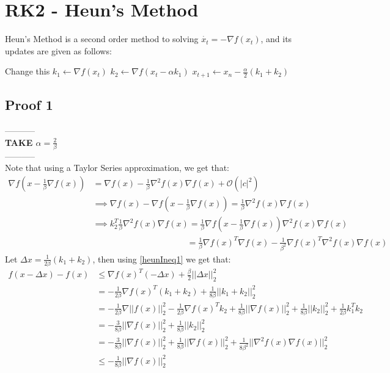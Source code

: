 \section{RK2 - Heun's Method}
Heun's Method is a second order method to solving $\dot{x_t} = - \nabla f(x_t)$, and its updates are given as follows:
\begin{algorithmic}
\STATE Change this
  \STATE $k_1 \gets \nabla f(x_t)$
  \STATE $k_2 \gets \nabla f(x_t - \alpha k_1) $
  \STATE $x_{t+1} \gets x_n - \frac{\alpha}{2}(k_1 + k_2)$
\ENDFOR
\end{algorithmic}
\subsection{Proof 1}
----------- \\
\textbf{TAKE $\alpha = \frac{2}{\beta}$} \\
-----------\\
Note that using a Taylor Series approximation, we get that:
\begin{equation} \label{heunIneq1}
\begin{aligned}
\nabla f(x -  \frac{1}{\beta}\nabla f(x)) &= \nabla f(x) - \frac{1}{\beta}\nabla^2 f(x) \nabla f(x) + \mathcal{O}(|c|^2) \\
& \implies  \nabla f(x) - \nabla f(x-\frac{1}{\beta}\nabla f(x)) = \frac{1}{\beta} \nabla^2 f(x) \nabla f(x) \\
& \implies   k_2 ^T \frac{1}{\beta} \nabla^2 f(x) \nabla f(x) =  \frac{1}{\beta} \nabla f(x -  \frac{1}{\beta}\nabla f(x))  \nabla^2 f(x) \nabla f(x) \\
 &\quad \quad \quad \quad \quad \quad \quad \quad \quad \quad  \quad = \frac{1}{\beta} \nabla f(x)^T \nabla f(x) - \frac{1}{\beta^2} \nabla f(x)^T \nabla^2 f(x) \nabla f(x)
\end{aligned}
\end{equation}
Let $\Delta x = \frac{1}{2\beta}(k_1 + k_2) $, then using \eqref{heunIneq1} we get that:
\begin{equation}
\begin{aligned}
f(x - \Delta x) - f(x) &\leq \nabla f(x)^T ( - \Delta x) + \frac{\beta}{2}|| \Delta x||_2^2 \\
& = - \frac{1}{2\beta}\nabla f(x)^T (k_1 + k_2) + \frac{1}{8\beta}||k_1 + k_2 ||_2^2 \\
& = - \frac{1}{2\beta}\nabla ||f(x)||_2^2 - \frac{1}{2\beta}\nabla f(x)^T k_2 + \frac{1}{8\beta}||\nabla f(x)||_2^2 + \frac{1}{8\beta}||k_2||_2^2 + \frac{1}{2\beta}k_1^T k_2 \\
& = -\frac{3}{8\beta}||\nabla f(x)||_2^2 + \frac{1}{8\beta}||k_2||_2^2 \\
& = -\frac{3}{8\beta}||\nabla f(x)||_2^2 + \frac{1}{8\beta}||\nabla f(x)||_2^2 + \frac{1}{8\beta^2}||\nabla^2 f(x) \nabla f(x)||_2^2 \\
& \leq - \frac{1}{8\beta}|| \nabla f(x)||_2^2
\end{aligned}
\end{equation}

